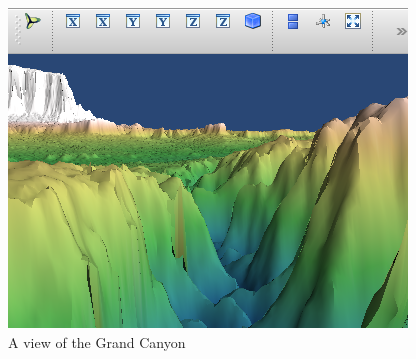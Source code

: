 \begin{figure} 
\includegraphics[width=\textwidth]{GrandCanyon.pdf}
\caption{A view of the Grand Canyon} 
\label{mayavi:GrandCanyon}
\end{figure}

